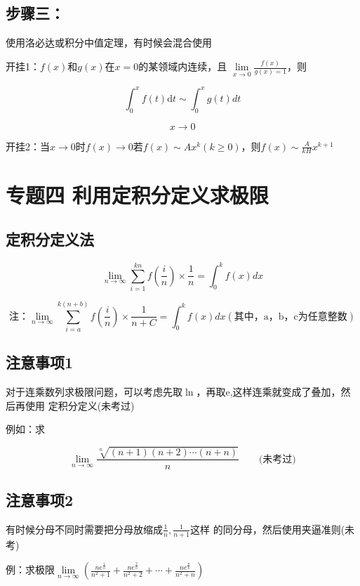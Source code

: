 \documentclass[a4paper,11pt]{book}
\begin{document}
\subsection*{步骤三：}

使用洛必达或积分中值定理，有时候会混合使用

开挂1：$f(x)\text{和}g(x)\text{在}x=0\text{的某领域内连续，且}$
$\lim \limits _{x \rightarrow 0 }\frac{f(x)}{g(x)=1}$，则

\[
    \int _{0}^{x}f(t)\mathrm{d}t \sim \int _{0}^{x}g(t)dt  
\]

\[
    x \rightarrow 0
\]

开挂2：当$x \rightarrow 0 \text{时} f(x) \rightarrow 0 \text{若}f(x) \sim A x^{k}(k \ge 0)\text{，则}f(x) \sim 
\frac{A}{kH}x^{k+1}$

\section*{专题四  \quad 利用定积分定义求极限}
\subsection*{定积分定义法}

\[
  \lim _{n \rightarrow \infty} \sum _{i = 1}^{kn}f(\frac{i}{n}) \times \frac{1}{n}=\int_{0}^{k}f(x)dx  
\]

\[\text{注：}\lim _{n \rightarrow \infty}\sum _{i=a}^{k(n+b)}f(\frac{i}{n})\times \frac{1}{n+C}=\int _{0}^{k}f(x)dx
\left(\text{其中，a，b，c为任意整数}\right)
    \]

\subsection*{注意事项1}

对于连乘数列求极限问题，可以考虑先取$\ln$，再取e,这样连乘就变成了叠加，然后再使用
定积分定义(未考过)

例如：求            

$$\lim _{n \rightarrow \infty} \frac{\sqrt[n]{(n+1)(n+2) \cdots(n+n)}}{n}
\qquad \text{(未考过)}$$

\subsection*{注意事项2}
有时候分母不同时需要把分母放缩成$\frac{1}{n},\frac{1}{n+1}$这样
的同分母，然后使用夹逼准则(未考)

例：求极限$\lim \limits _{n \rightarrow \infty}\left(\frac{ne^{\frac{1}{n}}}{n^{2}+1}+\frac{ne^{\frac{2}{n}}}{n^{2}+2}+\cdots+\frac{ne^{\frac{n}{n}}}{n^{2}+n}\right)$
\end{document}
